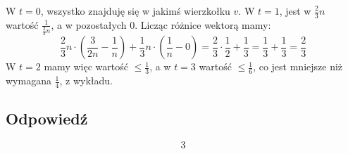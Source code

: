 W \(t = 0\), wszystko znajduję się w jakimś wierzkołku \(v\). W \(t = 1\), jest w \(\frac{2}{3}n\) wartość \(\frac{1}{\frac{2}{3}n}\), a w pozostałych \(0\). Licząc różnice wektorą mamy:
\[
	\frac{2}{3}n \cdot (\frac{3}{2n} - \frac{1}{n}) + \frac{1}{3}n \cdot (\frac{1}{n} - 0) = \frac{2}{3} \cdot \frac{1}{2} + \frac{1}{3} = \frac{1}{3} + \frac{1}{3} = \frac{2}{3}
\]
W \(t = 2\) mamy więc wartość \(\leq \frac{1}{3}\), a w \(t = 3\) wartość \(\leq \frac{1}{6}\), co jest mniejsze niż wymagana \(\frac{1}{4}\), z wykładu.

\subsection*{Odpowiedź}
\[
	\boxed{\text{3}}
\]
